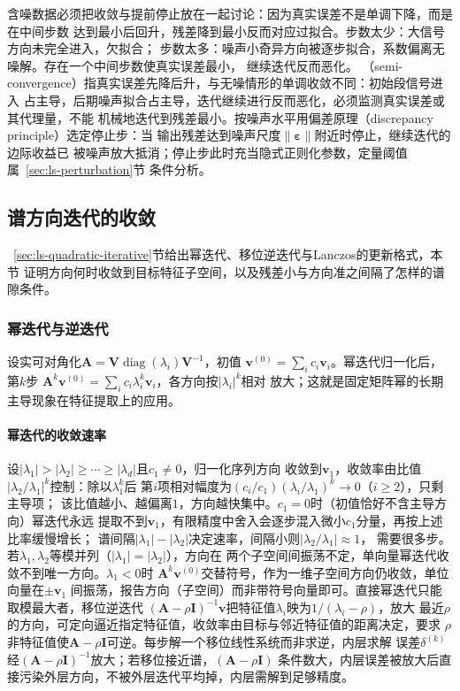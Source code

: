 含噪数据必须把收敛与提前停止放在一起讨论：因为真实误差不是单调下降，而是在中间步数
达到最小后回升，残差降到最小反而对应过拟合。步数太少：大信号方向未完全进入，欠拟合；
步数太多：噪声小奇异方向被逐步拟合，系数偏离无噪解。存在一个中间步数使真实误差最小，
继续迭代反而恶化。
（semi-convergence）指真实误差先降后升，与无噪情形的单调收敛不同：初始段信号进入
占主导，后期噪声拟合占主导，迭代继续进行反而恶化，必须监测真实误差或其代理量，不能
机械地迭代到残差最小。按噪声水平用偏差原理（discrepancy principle）选定停止步：当
输出残差达到噪声尺度$\lVert\bm\varepsilon\rVert$附近时停止，继续迭代的边际收益已
被噪声放大抵消；停止步此时充当隐式正则化参数，定量阈值属~\ref{sec:ls-perturbation}节
条件分析。

\subsection{谱方向迭代的收敛}
\label{sec:ls-spectral-iteration-convergence}

~\ref{sec:ls-quadratic-iterative}节给出幂迭代、移位逆迭代与Lanczos的更新格式，本节
证明方向何时收敛到目标特征子空间，以及残差小与方向准之间隔了怎样的谱隙条件。

\subsubsection{幂迭代与逆迭代}

设实可对角化$\bm A=\bm V\operatorname{diag}(\lambda_i)\bm V^{-1}$，初值
$\bm v^{(0)}=\sum_i c_i\bm v_i$。幂迭代归一化后，第$k$步
$\bm A^k\bm v^{(0)}=\sum_i c_i\lambda_i^k\bm v_i$，各方向按$|\lambda_i|^k$相对
放大；这就是固定矩阵幂的长期主导现象在特征提取上的应用。

\paragraph{幂迭代的收敛速率}

设$|\lambda_1|>|\lambda_2|\geq\cdots\geq|\lambda_d|$且$c_1\neq0$，归一化序列方向
收敛到$\bm v_1$，收敛率由比值$|\lambda_2/\lambda_1|^k$控制：除以$\lambda_1^k$后
第$i$项相对幅度为$(c_i/c_1)(\lambda_i/\lambda_1)^k\to0$（$i\geq2$），只剩主导项；
该比值越小、越偏离$1$，方向越快集中。$c_1=0$时（初值恰好不含主导方向）幂迭代永远
提取不到$\bm v_1$，有限精度中舍入会逐步混入微小$c_1$分量，再按上述比率缓慢增长；
谱间隔$|\lambda_1|-|\lambda_2|$决定速率，间隔小则$|\lambda_2/\lambda_1|\approx1$，
需要很多步。若$\lambda_1,\lambda_2$等模并列（$|\lambda_1|=|\lambda_2|$），方向在
两个子空间间振荡不定，单向量幂迭代收敛不到唯一方向。$\lambda_1<0$时
$\bm A^k\bm v^{(0)}$交替符号，作为一维子空间方向仍收敛，单位向量在$\pm\bm v_1$
间振荡，报告方向（子空间）而非带符号向量即可。直接幂迭代只能取模最大者，移位逆迭代
$(\bm A-\rho\bm I)^{-1}\bm v$把特征值$\lambda_i$映为$1/(\lambda_i-\rho)$，放大
最近$\rho$的方向，可定向逼近指定特征值，收敛率由目标与邻近特征值的距离决定，要求
$\rho$非特征值使$\bm A-\rho\bm I$可逆。每步解一个移位线性系统而非求逆，内层求解
误差$\delta^{(k)}$经$(\bm A-\rho\bm I)^{-1}$放大；若移位接近谱，$(\bm A-\rho\bm I)$
条件数大，内层误差被放大后直接污染外层方向，不被外层迭代平均掉，内层需解到足够精度。

